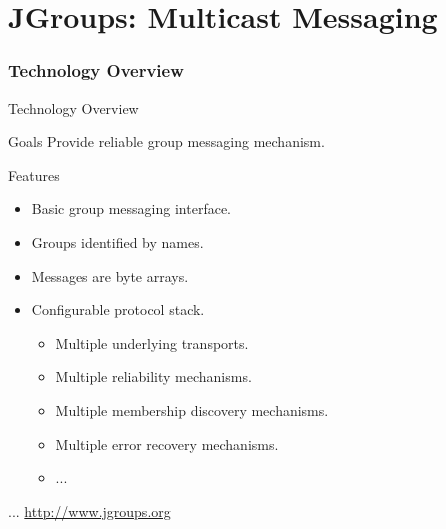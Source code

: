 \part{JGroups: Multicast Messaging}


\section{Technology Overview}


\begin{frame}{Technology Overview}
    \begin{block}{Goals}
        Provide reliable group messaging mechanism.
    \end{block}

    \bigskip

    \begin{block}{Features}
        \begin{itemize}
            \item Basic group messaging interface.
            \item Groups identified by names.
            \item Messages are byte arrays.
            \item Configurable protocol stack.
            \begin{itemize}
                \item Multiple underlying transports.
                \item Multiple reliability mechanisms.
                \item Multiple membership discovery mechanisms.
                \item Multiple error recovery mechanisms.
                \item ...
            \end{itemize}
        \end{itemize}
    \end{block}

    \bigskip

    \hfill ... \url{http://www.jgroups.org}
\end{frame}


